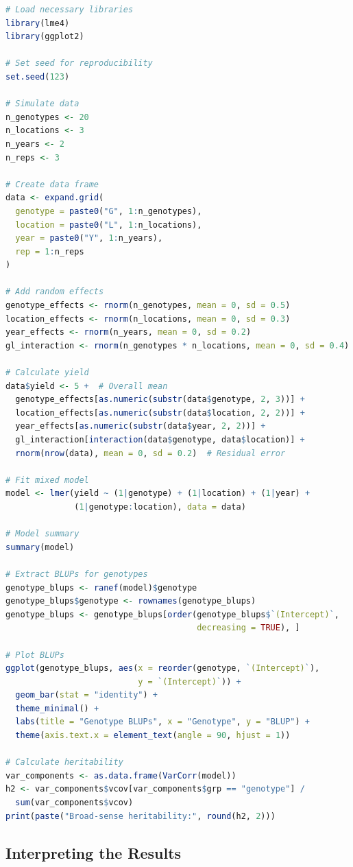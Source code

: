 \documentclass[12pt,a4paper]{article}
\begin{document}
\begin{lstlisting}[language=R]
# Load necessary libraries
library(lme4)
library(ggplot2)

# Set seed for reproducibility
set.seed(123)

# Simulate data
n_genotypes <- 20
n_locations <- 3
n_years <- 2
n_reps <- 3

# Create data frame
data <- expand.grid(
  genotype = paste0("G", 1:n_genotypes),
  location = paste0("L", 1:n_locations),
  year = paste0("Y", 1:n_years),
  rep = 1:n_reps
)

# Add random effects
genotype_effects <- rnorm(n_genotypes, mean = 0, sd = 0.5)
location_effects <- rnorm(n_locations, mean = 0, sd = 0.3)
year_effects <- rnorm(n_years, mean = 0, sd = 0.2)
gl_interaction <- rnorm(n_genotypes * n_locations, mean = 0, sd = 0.4)

# Calculate yield
data$yield <- 5 +  # Overall mean
  genotype_effects[as.numeric(substr(data$genotype, 2, 3))] +
  location_effects[as.numeric(substr(data$location, 2, 2))] +
  year_effects[as.numeric(substr(data$year, 2, 2))] +
  gl_interaction[interaction(data$genotype, data$location)] +
  rnorm(nrow(data), mean = 0, sd = 0.2)  # Residual error

# Fit mixed model
model <- lmer(yield ~ (1|genotype) + (1|location) + (1|year) + 
              (1|genotype:location), data = data)

# Model summary
summary(model)

# Extract BLUPs for genotypes
genotype_blups <- ranef(model)$genotype
genotype_blups$genotype <- rownames(genotype_blups)
genotype_blups <- genotype_blups[order(genotype_blups$`(Intercept)`, 
                                       decreasing = TRUE), ]

# Plot BLUPs
ggplot(genotype_blups, aes(x = reorder(genotype, `(Intercept)`), 
                           y = `(Intercept)`)) +
  geom_bar(stat = "identity") +
  theme_minimal() +
  labs(title = "Genotype BLUPs", x = "Genotype", y = "BLUP") +
  theme(axis.text.x = element_text(angle = 90, hjust = 1))

# Calculate heritability
var_components <- as.data.frame(VarCorr(model))
h2 <- var_components$vcov[var_components$grp == "genotype"] / 
  sum(var_components$vcov)
print(paste("Broad-sense heritability:", round(h2, 2)))
\end{lstlisting}

\subsection{Interpreting the Results}
\end{document}

